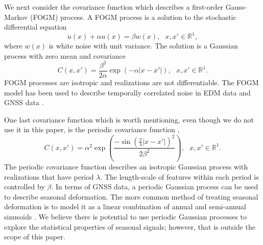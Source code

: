 \documentclass[10pt,a4paper]{article}
\begin{document}
We next consider the covariance function which describes a first-order Gauss-Markov (FOGM) process. A FOGM process is a solution to the stochastic differential equation
\begin{equation}
\dot{u}(x) + \alpha u(x) = \beta w(x), \ \ \ x,x' \in \mathbb{R}^1,
\end{equation}
where $w(x)$ is white noise with unit variance.  The solution is a Gaussian process with zero mean and covariance
\begin{equation}\label{eq:FOGM}
C(x,x') = \frac{\beta^2}{2\alpha}\exp\left(-\alpha|x - x'|\right), \ \ \ x,x' \in \mathbb{R}^1. 
\end{equation}
FOGM processes are isotropic and realizations are not differentiable.  The FOGM model has been used to describe temporally correlated noise in EDM data \citep{Langbein2004} and GNSS data \citep[e.g.,][]{Langbein2008}. 

One last covariance function which is worth mentioning, even though we do not use it in this paper, is the periodic covariance function \citep{Mackay1998}, 
\begin{equation}\label{eq:Periodic}
C(x,x') = \alpha^2 \exp\left(\frac{-\sin(\frac{\pi}{\lambda} |x - x'|)^2}{2 \beta^2} \right), \ \ \ x,x' \in \mathbb{R}^1.
\end{equation}
The periodic covariance function describes an isotropic Gaussian process with realizations that have period $\lambda$.  The length-scale of features within each period is controlled by $\beta$. In terms of GNSS data, a periodic Gaussian process can be used to describe seasonal deformation. The more common method of treating seasonal deformation is to model it as a linear combination of annual and semi-annual sinusoids \citep[e.g.,][]{Dong2002}. We believe there is potential to use periodic Gaussian processes to explore the statistical properties of seasonal signals; however, that is outside the scope of this paper.   
\end{document}
